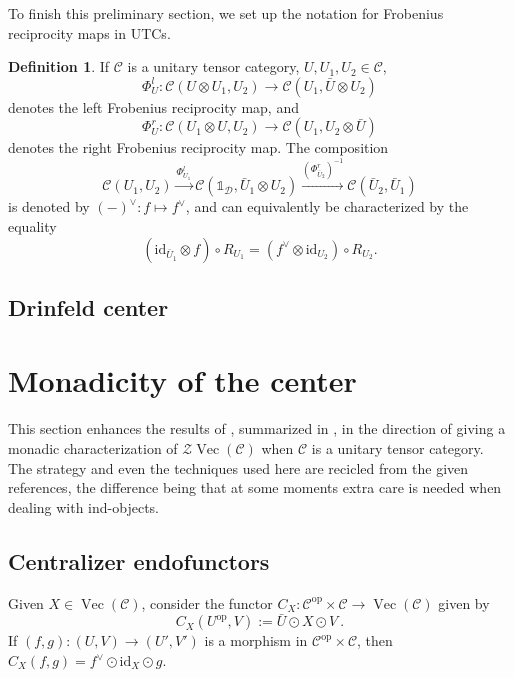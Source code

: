 \documentclass[a4paper,11pt,reqno]{amsart}
\numberwithin{equation}{section}
\theoremstyle{remark}
\theoremstyle{definition}
\newtheorem{definition}[theorem]{Definition}
\newcommand{\cC}{\mathcal C}
\newcommand{\cD}{\mathcal D}
\newcommand{\cZ}{\mathcal Z}
\DeclareMathOperator{\Vect}{Vec}
\newcommand\op{\text{op}}
\newcommand\un{{\mathds 1}}
\newcommand{\id}{\mathrm{id}}
\begin{document}
To finish this preliminary section, we set up the notation for Frobenius reciprocity maps in UTCs.

\begin{definition}
    If $\cC$ is a unitary tensor category, $U,U_1,U_2 \in \cC$, 
    \[ \Phi^l_U : \cC(U \otimes U_1,U_2) \to \cC(U_1,\bar{U} \otimes U_2) \]
    denotes the left Frobenius reciprocity map, and 
    \[
    \Phi_U^r: \cC(U_1 \otimes U,U_2) \to \cC(U_1, U_2 \otimes \bar{U})
    \]
    denotes the right Frobenius reciprocity map. The composition
    \[
    \cC(U_1, U_2) \overset{\Phi_{U_1}^l}{\longrightarrow} \cC(\un_{\cD},\bar{U}_1 \otimes U_2) \overset{(\Phi_{\bar{U}_2}^r)^{-1}}{\longrightarrow} \cC(\bar{U}_2 , \bar{U}_1)  
     \]
    is denoted by $(-)^\vee: f \mapsto f^\vee$, and can equivalently be characterized by the equality
    \[
    (\id_{\bar{U}_1} \otimes f) \circ R_{U_1} = (f^\vee \otimes \id_{U_2}) \circ R_{U_2} . 
    \]
\end{definition}


\subsection{Drinfeld center}



\section{Monadicity of the center}

This section enhances the results of  \cites{MR2355605,MR2793022,MR2869176,MR3079759}, summarized in \cite{MR3674995},  in the direction of giving a monadic characterization of $\cZ \Vect(\cC)$ when $\cC$ is a unitary tensor category. The strategy and even the techniques used here are recicled from the given references, the difference being that at some moments extra care is needed when dealing with ind-objects. 




\subsection{Centralizer endofunctors}
Given $X \in \Vect(\cC)$, consider the functor $C_X: \cC^{\op} \times \cC \to \Vect(\cC)$ given by
$$C_X(U^{\op},V) := \bar{U} \odot X \odot V \ . $$
If $(f,g):(U,V) \to (U', V')$ is a morphism in $\cC^{\op} \times \cC$, then $C_X(f,g) = f^\vee \odot \id_X \odot g$. 
\end{document}
